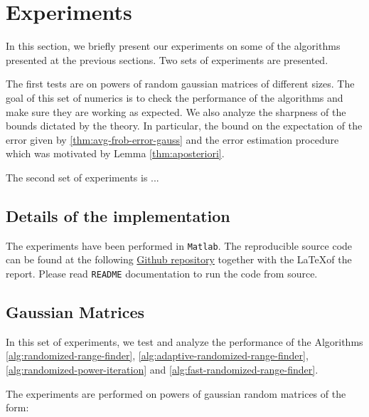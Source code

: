 \section*{Experiments}
In this section, we briefly present our experiments on some of the 
algorithms presented at the previous sections. Two sets of experiments are presented.

The first tests are on powers
of random gaussian matrices of different sizes. The goal of this set of numerics
is to check the performance of the algorithms and make sure they are working
as expected. We also analyze the sharpness of the bounds dictated by the theory.
In particular, the bound on the expectation of the error given
by \ref{thm:avg-frob-error-gauss} and
the error estimation procedure which was motivated by 
Lemma \ref{thm:aposteriori}.

The second set of experiments is ...

\subsection{Details of the implementation}
The experiments have been performed in \verb|Matlab|. The reproducible
source code can be found at the following 
\href{https://github.com/alexnowakvila/ProbAlgosProj}{Github repository}
together with the \LaTeX  of the report. Please read \verb|README| documentation
to run the code from source.
\subsection{Gaussian Matrices} \label{sec:gaussian-matrices}
In this set of experiments, we test and analyze the performance of the 
Algorithms \ref{alg:randomized-range-finder}, 
\ref{alg:adaptive-randomized-range-finder},
\ref{alg:randomized-power-iteration}
and \ref{alg:fast-randomized-range-finder}.

The experiments are performed on powers of gaussian random
matrices of the form:

